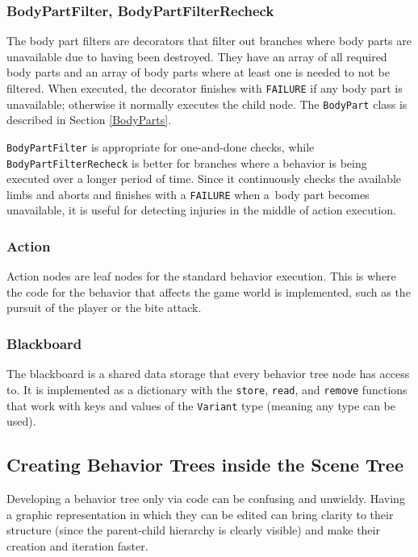 \subsubsection{BodyPartFilter, BodyPartFilterRecheck}
The body part filters are decorators that filter out branches where body parts are unavailable due to having been destroyed. They have an array of all required body parts and an array of body parts where at least one is needed to not be filtered. When executed, the decorator finishes with \texttt{FAILURE} if any body part is unavailable; otherwise it normally executes the child node. The \texttt{BodyPart} class is described in Section \ref{BodyParts}.

\texttt{BodyPartFilter} is appropriate for one-and-done checks, while \texttt{BodyPartFilterRecheck} is better for branches where a behavior is being executed over a longer period of time. Since it continuously checks the available limbs and aborts and finishes with a \texttt{FAILURE} when a~body part becomes unavailable, it is useful for detecting injuries in the middle of action execution.

\subsubsection{Action}
Action nodes are leaf nodes for the standard behavior execution. This is where the code for the behavior that affects the game world is implemented, such as the pursuit of the player or the bite attack.

\subsubsection{Blackboard}
The blackboard is a shared data storage that every behavior tree node has access to. It is implemented as a dictionary with the \texttt{store}, \texttt{read}, and \texttt{remove} functions that work with keys and values of the \texttt{Variant} type (meaning any type can be used).


\subsection{Creating Behavior Trees inside the Scene Tree}
\label{BT_SceneTreeCreation}
Developing a behavior tree only via code can be confusing and unwieldy. Having a graphic representation in which they can be edited can bring clarity to their structure (since the parent-child hierarchy is clearly visible) and make their creation and iteration faster.

